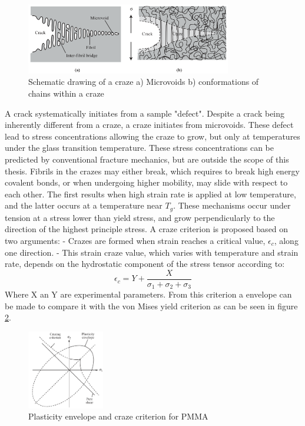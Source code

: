 \begin{figure}[H]
    \centering
    \includegraphics[width=0.8\textwidth]{chapter_2/figures/Craze.png}
    \caption{Schematic drawing of a craze a) Microvoids b) conformations of chains within a craze \cite{Halary2011PolymerMaterials}}
    \label{fig:Craze}
\end{figure}
A crack systematically initiates from a sample "defect". Despite a crack being inherently different from a craze, a craze initiates from microvoids. These defect lead to stress concentrations allowing the craze to grow, but only at temperatures under the glass transition temperature. These stress concentrations can be predicted by conventional fracture mechanics, but are outside the scope of this thesis. Fibrils in the crazes may either break, which requires to break high energy covalent bonds, or when undergoing higher mobility, may slide with respect to each other. The first results when high strain rate is applied at low temperature, and the latter occurs at a  temperature near $T_g$. These mechanisms occur under tension at a stress lower than yield stress, and grow perpendicularly to the direction of the highest principle stress.
A craze criterion is proposed based on two arguments:
- Crazes are formed when strain reaches a critical value, $\epsilon_c$, along one direction.
- This strain craze value, which varies with temperature and strain rate, depends on the hydrostatic component of the stress tensor according to:
\begin{equation} \label{eqn:crazecriterion}
 \epsilon_c=Y+\frac{X}{\sigma_1+\sigma_2+\sigma_3}
\end{equation}
Where X an Y are experimental parameters. From this criterion a envelope can be made to compare it with the von Mises yield criterion as can be seen in figure \ref{fig:crazecrit}. 

\begin{figure}[H]
    \centering
    \includegraphics[width=0.3\textwidth]{chapter_2/figures/crazecrit.png}
    \caption{Plasticity envelope and craze criterion for PMMA \cite{Halary2011PolymerMaterials}}
    \label{fig:crazecrit}
\end{figure}

